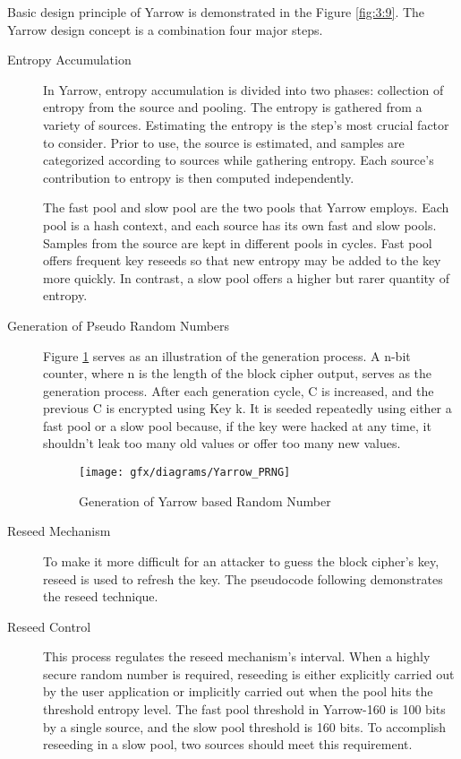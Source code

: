 Basic design principle of Yarrow is demonstrated in the Figure \ref{fig:3:9}. The Yarrow design concept is a combination four major steps. 
\begin{description}
	\item[Entropy Accumulation] In Yarrow, entropy accumulation is divided into two phases: collection of entropy from the source and pooling. The entropy is gathered from a variety of sources. Estimating the entropy is the step's most crucial factor to consider. Prior to use, the source is estimated, and samples are categorized according to sources while gathering entropy. Each source's contribution to entropy is then computed independently.
	 
	The fast pool and slow pool are the two pools that Yarrow employs. Each pool is a hash context, and each source has its own fast and slow pools. Samples from the source are kept in different pools in cycles. Fast pool offers frequent key reseeds so that new entropy may be added to the key more quickly. In contrast, a slow pool offers a higher but rarer quantity of entropy. 
	
	\item[Generation of Pseudo Random Numbers] Figure \ref{fig:3:10} serves as an illustration of the generation process. A n-bit counter, where n is the length of the block cipher output, serves as the generation process. After each generation cycle, C is increased, and the previous C is encrypted using Key k. It is seeded repeatedly using either a fast pool or a slow pool because, if the key were hacked at any time, it shouldn't leak too many old values or offer too many new values.
	\begin{figure}[htbp]
		\centering
		\texttt{[image: gfx/diagrams/Yarrow\_PRNG]}
		\caption{Generation of Yarrow based Random Number}
		\label{fig:3:10}
	\end{figure}

	\item[Reseed Mechanism] To make it more difficult for an attacker to guess the block cipher's key, reseed is used to refresh the key. The pseudocode following demonstrates the reseed technique.
	
	\item[Reseed Control] This process regulates the reseed mechanism's interval. When a highly secure random number is required, reseeding is either explicitly carried out by the user application or implicitly carried out when the pool hits the threshold entropy level. The fast pool threshold in Yarrow-160 is 100 bits by a single source, and the slow pool threshold is 160 bits. To accomplish reseeding in a slow pool, two sources should meet this requirement.
	
\end{description}

